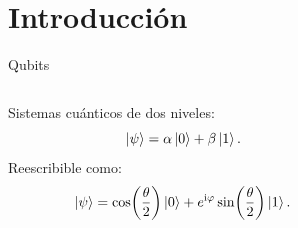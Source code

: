 \section{Introducción}
\begin{frame}{Qubits}
    \begin{columns}
        \begin{column}{0.5\textwidth}
            Sistemas cuánticos de dos niveles:\pause
            \begin{equation}
                \ket{\psi}=\alpha\ket{0}+\beta\ket{1}.\nonumber
            \end{equation}\pause
            Reescribible como:\pause
            \begin{equation}
                \ket{\psi}=\cos(\frac{\theta}{2})\ket{0}+e^{\text{i}\varphi}\sin(\frac{\theta}{2})\ket{1}.\nonumber
            \end{equation}
        \end{column}
        \pause
        \begin{column}{0.5\textwidth}
            \centering
            \BlochSphere
        \end{column}
    \end{columns}
\end{frame}

